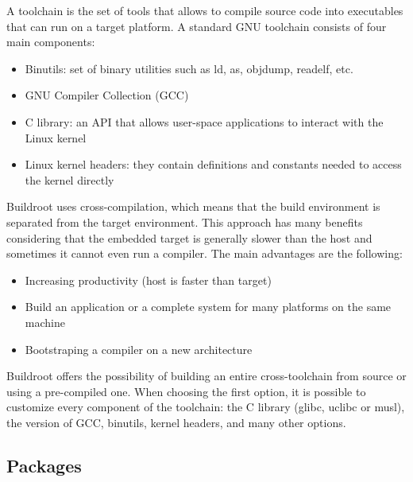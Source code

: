 \documentclass[12pt,a4paper,oneside]{article}
\begin{document}
A toolchain is the set of tools that allows to compile source code into executables
that can run on a target platform. A standard GNU toolchain consists of four
main components:
\begin{itemize}
  \item Binutils: set of binary utilities such as ld, as, objdump, readelf, etc.
  \item GNU Compiler Collection (GCC)
  \item C library: an API that allows user-space applications to
  interact with the Linux kernel
  \item Linux kernel headers: they contain definitions and constants needed to
  access the kernel directly
\end{itemize}
Buildroot uses cross-compilation, which means that the build environment is
separated from the target environment. This approach has many benefits considering
that the embedded target is generally slower than the host and sometimes it cannot
even run a compiler. The main advantages are the following:
\begin{itemize}
  \item Increasing productivity (host is faster than target)
  \item Build an application or a complete system for many platforms on the same
  machine
  \item Bootstraping a compiler on a new architecture
\end{itemize}
Buildroot offers the possibility of building an entire cross-toolchain from
source or using a pre-compiled one. When choosing the first option, it is possible
to customize every component of the toolchain: the C library (glibc, uclibc or
musl), the version of GCC, binutils, kernel headers, and many other options.

\subsection{Packages}
\end{document}
